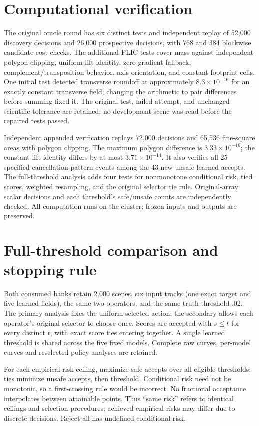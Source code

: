 \section{Computational verification}
The original oracle round has six distinct tests and independent replay of
52,000 discovery decisions and 26,000 prospective decisions, with 768 and 384
blockwise candidate-cost checks. The additional PLIC tests cover mass against
independent polygon clipping, uniform-lift identity, zero-gradient fallback,
complement/transposition behavior, axis orientation, and constant-footprint
cells. One initial test detected transverse roundoff at approximately
$8.3\times 10^{-16}$ for an exactly constant transverse field; changing the
arithmetic to pair differences before summing fixed it. The original test,
failed attempt, and unchanged scientific tolerance are retained; no development
scene was read before the repaired tests passed.

Independent appended verification replays 72,000 decisions and 65,536 fine-square
areas with polygon clipping. The maximum polygon difference is
$3.33\times10^{-16}$; the constant-lift identity differs by at most
$3.71\times10^{-14}$. It also verifies all 25 specified cancellation-pattern
events among the 43 new unsafe learned accepts. The full-threshold analysis adds
four tests for nonmonotone conditional risk, tied scores, weighted resampling,
and the original selector tie rule. Original-array scalar decisions and each
threshold's safe/unsafe counts are independently checked. All computation runs
on the cluster; frozen inputs and outputs are preserved.

\section{Full-threshold comparison and stopping rule}
\label{app:matched}
Both consumed banks retain 2,000 scenes, six input tracks (one exact target and
five learned fields), the same two operators, and the same truth threshold .02.
The primary analysis fixes the uniform-selected action; the secondary allows
each operator's original selector to choose once. Scores are accepted with
$s\le t$ for every distinct $t$, with exact score ties entering together.
A single learned threshold is shared across the five fixed models. Complete
raw curves, per-model curves and reselected-policy analyses are retained.

For each empirical risk ceiling, maximize safe accepts over all eligible
thresholds; ties minimize unsafe accepts, then threshold. Conditional risk need
not be monotonic, so a first-crossing rule would be incorrect. No fractional
acceptance interpolates between attainable points. Thus ``same risk'' refers
to identical ceilings and selection procedures; achieved empirical risks may
differ due to discrete decisions. Reject-all has undefined conditional risk.

